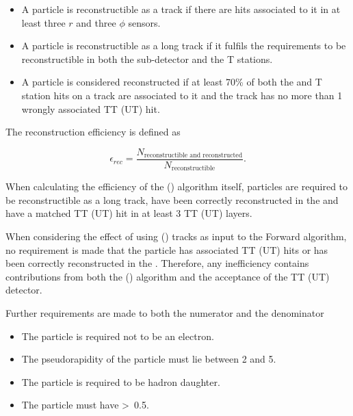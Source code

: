 \begin{itemize}

\item A particle is reconstructible as a \velo track if there are hits associated to it in at least three $r$ and three $\phi$ \velo sensors.

\item A particle is reconstructible as a long track if it fulfils the requirements to be reconstructible in both the \velo sub-detector and the T stations.

\item A particle is considered reconstructed if at least 70\% of both the \velo and T station hits on a track are associated to it and the track has no more than 1 wrongly associated TT (UT) hit.

\end{itemize}

\noindent The reconstruction efficiency is defined as

\begin{equation}
\epsilon_{rec} = \frac{N_{\text{reconstructible~and~reconstructed}}}{N_{\text{reconstructible}}}.
\end{equation}

When calculating the efficiency of the \velott (\velout) algorithm itself, particles are required to be reconstructible as a long track, have been correctly reconstructed in the \velo and have a matched TT (UT) hit in at least 3 TT (UT) layers. 

When considering the effect of using \velott (\velout) tracks as input to the Forward algorithm, no requirement is made that the particle has associated TT (UT) hits or has been correctly reconstructed in the \velo. Therefore, any inefficiency contains contributions from both the \velott (\velout) algorithm and the acceptance of the TT (UT) detector. 

Further requirements are made to both the numerator and the denominator

\begin{itemize}
\item The particle is required not to be an electron.
\item The pseudorapidity of the particle must lie between 2 and 5.
\item The particle is required to be \bquark hadron daughter.
\item The particle must have \pt\textgreater~0.5\gevc.
\end{itemize}


